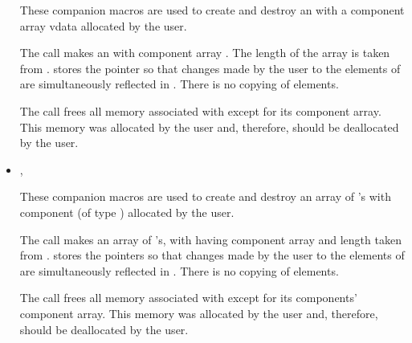 \begin{itemize}
      These companion macros are used to create and          
      destroy an  with a component array vdata        
      allocated by the user.                                   
                                                               
      The call  makes  an        
       with component array . The length of the  
      array is taken from .                             
       stores the pointer  so that changes      
      made by the user to the elements of  are           
      simultaneously reflected in . There is no copying of    
      elements.                                                
                                                               
      The call  frees all memory associated     
      with  except for its component array. This memory was   
      allocated by the user and, therefore, should be          
      deallocated by the user.   

\item {}, 
                             
      These companion macros are used to create and destroy  
      an array of 's with component  
      (of type ) allocated by the user.       

                                                               
      The call  makes   
       an array of  's, with  
      having component array  and length taken from .    
       stores the pointers  so that        
      changes made by the user to the elements of  are  
      simultaneously reflected in . There is no copying of   
      elements.                                                
                                                               
      The call  frees all memory associated   
      with  except for its components' component array.      
      This memory was allocated by the user and, therefore,    
      should be deallocated by the user.                       

\end{itemize}

